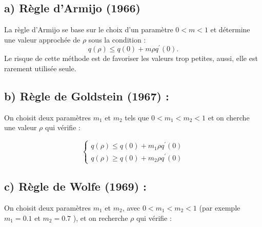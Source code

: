 \documentclass[12pt,a4paper,openay]{book}
\numberwithin{equation}{chapter}
\begin{document}
	\subsection*{a) R\`egle d'Armijo (1966)}
	La r\`egle d'Armijo se base sur le choix d'un param\`etre $0<m<1$ et d\'etermine une valeur approch\'ee de $\rho$ sous la condition :	
	$$
	q(\rho) \leq q(0)+m \rho q^{\prime}(0).
	$$	
	Le risque de cette m\'ethode est de favoriser les valeurs trop petites, aussi, elle est rarement utilis\'ee seule.
	
	\subsection*{b) R\`egle de Goldstein (1967) :}
	On choisit deux param\`etres  $m_{1}$ et $m_{2}$  tels que $0<m_{1}<m_{2}<1$ et on cherche une valeur $\rho$ qui v\'erifie :
	
	$$
	\begin{cases}
	q(\rho) \leq q(0)+m_{1} \rho q^{\prime}(0) \\
	q(\rho) \geq q(0)+m_{2} \rho q^{\prime}(0)
	\end{cases}
	$$
	
	\subsection*{c) R\`egle de Wolfe (1969) :}
	On choisit deux param\`etres $m_{1}$ et $m_{2}$, avec $0<m_{1}<m_{2}<1$ (par exemple $m_{1}=0.1$ et $m_{2}=0.7$ ), et on recherche $\rho$ qui v\'erifie :
	
\end{document}

